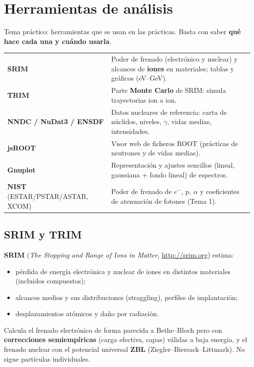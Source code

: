 \chapter{Herramientas de análisis}
Tema práctico: herramientas que se usan en las prácticas. Basta con saber \textbf{qué hace cada una y cuándo usarla}.

\begin{clave}
\begin{center}\small
\begin{tabularx}{\linewidth}{lX}
\toprule
\textbf{SRIM} & Poder de frenado (electrónico y nuclear) y alcances de \textbf{iones} en materiales; tablas y gráficos (eV--GeV).\\
\textbf{TRIM} & Parte \textbf{Monte Carlo} de SRIM: simula trayectorias ion a ion.\\
\textbf{NNDC / NuDat3 / ENSDF} & Datos nucleares de referencia: carta de núclidos, niveles, $\gamma$, vidas medias, intensidades.\\
\textbf{jsROOT} & Visor web de ficheros ROOT (prácticas de neutrones y de vidas medias).\\
\textbf{Gnuplot} & Representación y ajustes sencillos (lineal, gaussiana + fondo lineal) de espectros.\\
\textbf{NIST} (ESTAR/PSTAR/ASTAR, XCOM) & Poder de frenado de $e^-$, p, $\alpha$ y coeficientes de atenuación de fotones (Tema 1).\\
\bottomrule
\end{tabularx}
\end{center}
\end{clave}

\section{SRIM y TRIM}
\textbf{SRIM} (\emph{The Stopping and Range of Ions in Matter}, \url{http://srim.org}) estima:
\begin{itemize}
\item pérdida de energía electrónica y nuclear de iones en distintos materiales (incluidos compuestos);
\item alcances medios y sus distribuciones (straggling), perfiles de implantación;
\item desplazamientos atómicos y daño por radiación.
\end{itemize}
Calcula el frenado electrónico de forma parecida a Bethe--Bloch pero con \textbf{correcciones semiempíricas} (carga efectiva, capas) válidas a baja energía,
y el frenado nuclear con el potencial universal \textbf{ZBL} (Ziegler--Biersack--Littmark). No sigue partículas individuales.

